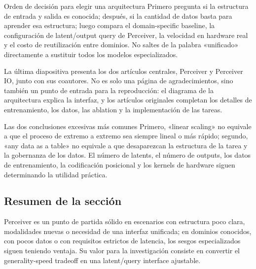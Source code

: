 \begin{importantbox}{Orden de decisión para elegir una arquitectura}
Primero pregunta si la estructura de entrada y salida es conocida; después, si la cantidad de datos basta para aprender esa estructura; luego compara el domain-specific baseline, la configuración de latent/output query de Perceiver, la velocidad en hardware real y el costo de reutilización entre dominios. No saltes de la palabra «unificado» directamente a sustituir todos los modelos especializados.
\end{importantbox}

La última diapositiva presenta los dos artículos centrales, Perceiver y Perceiver IO, junto con sus coautores. No es solo una página de agradecimientos, sino también un punto de entrada para la reproducción: el diagrama de la arquitectura explica la interfaz, y los artículos originales completan los detalles de entrenamiento, los datos, las ablation y la implementación de las tareas.


\begin{warningbox}{Las dos conclusiones excesivas más comunes}
Primero, «linear scaling» no equivale a que el proceso de extremo a extremo sea siempre lineal o más rápido; segundo, «any data as a table» no equivale a que desaparezcan la estructura de la tarea y la gobernanza de los datos. El número de latents, el número de outputs, los datos de entrenamiento, la codificación posicional y los kernels de hardware siguen determinando la utilidad práctica.
\end{warningbox}

\subsection{Resumen de la sección}

Perceiver es un punto de partida sólido en escenarios con estructura poco clara, modalidades nuevas o necesidad de una interfaz unificada; en dominios conocidos, con pocos datos o con requisitos estrictos de latencia, los sesgos especializados siguen teniendo ventaja. Su valor para la investigación consiste en convertir el generality-speed tradeoff en una latent/query interface ajustable.
